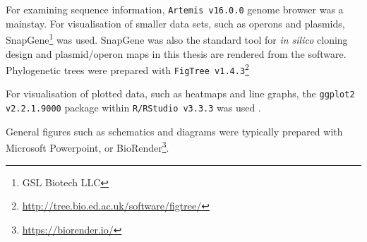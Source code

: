 For examining sequence information, \texttt{Artemis v16.0.0} \citep{Rutherford2000} genome browser was a mainstay. For visualisation of smaller data sets, such as operons and plasmids, SnapGene\footnote{GSL Biotech LLC} was used. SnapGene was also the standard tool for \emph{in silico} cloning design and plasmid/operon maps in this thesis are rendered from the software. Phylogenetic trees were prepared with \texttt{FigTree v1.4.3}\footnote{\url{http://tree.bio.ed.ac.uk/software/figtree/}}

For visualisation of plotted data, such as heatmaps and line graphs, the \texttt{ggplot2 v2.2.1.9000} package \citep{Wickham2009} within \texttt{R/RStudio v3.3.3} was used \citep{RStudioTeam2015, RCoreTeam2014}.

General figures such as schematics and diagrams were typically prepared with Microsoft Powerpoint, or BioRender\footnote{\url{https://biorender.io/}}.



